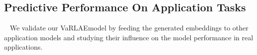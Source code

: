 \documentclass[letterpaper]{article} %
\newcommand{\system}{VaRLAE\;}
\begin{document}


\subsection{Predictive Performance On Application Tasks}

~\label{subsec:downstream-applications}
We validate our \system model by feeding the generated embeddings to other application models and studying their influence on the model performance in real applications.
\end{document}
